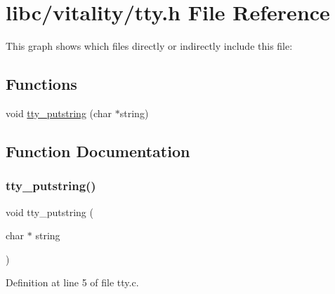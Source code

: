 \hypertarget{a00023}{}\section{libc/vitality/tty.h File Reference}
\label{a00023}
This graph shows which files directly or indirectly include this file\+:
\subsection*{Functions}
\begin{DoxyCompactItemize}
\item 
void \hyperlink{a00023_a2ebb962f457a2677d70285d1c0f9be12_a2ebb962f457a2677d70285d1c0f9be12}{tty\+\_\+putstring} (char $\ast$string)
\end{DoxyCompactItemize}


\subsection{Function Documentation}
\mbox{\label{a00023_a2ebb962f457a2677d70285d1c0f9be12_a2ebb962f457a2677d70285d1c0f9be12}} 
\subsubsection{\texorpdfstring{tty\+\_\+putstring()}{tty\_putstring()}}
{\footnotesize\ttfamily void tty\+\_\+putstring (\begin{DoxyParamCaption}\item[{char $\ast$}]{string }\end{DoxyParamCaption})}



Definition at line 5 of file tty.\+c.

